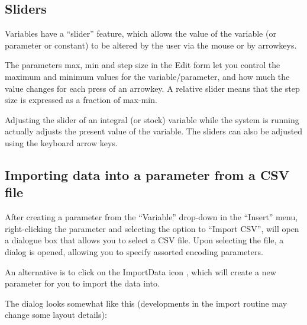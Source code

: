 \subsection{Sliders}

Variables have a ``slider'' feature, which allows the value of the
variable (or parameter or constant) to be altered by the user via
the mouse or by arrowkeys.

The parameters max, min and step size in the Edit form let you control
the maximum and minimum values for the variable/parameter, and how
much the value changes for each press of an arrowkey. A relative slider
means that the step size is expressed as a fraction of max-min.

Adjusting the slider of an integral (or stock) variable while the
system is running actually adjusts the present value of the variable.
The sliders can also be adjusted using the keyboard arrow keys.

\subsection{Importing data into a parameter from a CSV file}

\label{CSV import} \label{Operation:csvImport}

After creating a parameter from the ``Variable'' drop-down in the
``Insert'' menu, right-clicking the parameter and selecting the
option to ``Import CSV'', will open a dialogue box that allows you
to select a CSV file. Upon selecting the file, a dialog is opened,
allowing you to specify assorted encoding parameters.

An alternative is to click on the ImportData icon ,
which will create a new parameter for you to import the data into.

The dialog looks somewhat like this (developments in the import routine
may change some layout details):
\begin{center}
\par\end{center}

